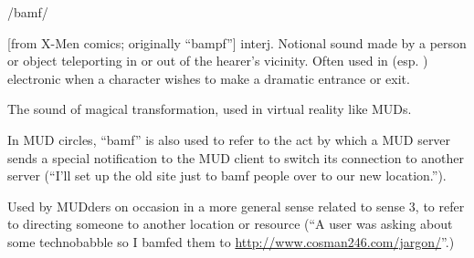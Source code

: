  /bamf/

\begin{inparaenum}
	\item {[}from X-Men comics; originally ``bampf''] interj. Notional sound made
		by a person or object teleporting in or out of the hearer's vicinity.
		Often used in  (esp. )
		electronic  when a character wishes to make a dramatic
		entrance or exit.
	\item The sound of magical transformation, used in virtual reality
		 like MUDs.
	\item In MUD circles, ``bamf'' is also used to refer to the act by which a
		MUD server sends a special notification to the MUD client to switch its
		connection to another server (``I'll set up the old site just to bamf
		people over to our new location.'').
	\item Used by MUDders on occasion in a more general sense related to sense
		3, to refer to directing someone to another location or resource (``A
		user was asking about some technobabble so I bamfed them to
		\url{http://www.cosman246.com/jargon/}''.)
\end{inparaenum}

